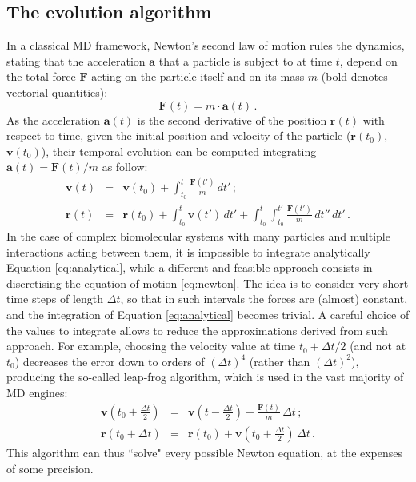 \subsection{The evolution algorithm}
In a classical MD framework, Newton's second law of motion rules the dynamics, stating that the acceleration $\textbf{a}$ that a particle is subject to at time $t$, depend on the total force $\textbf{F}$ acting on the particle itself and on its mass $m$ (bold denotes vectorial quantities):
\begin{equation} \label{eq:newton}
\textbf{F}(t) =  m \cdot \textbf{a}(t) \, .
\end{equation}
As the acceleration $\textbf{a}(t)$ is the second derivative of the position $\textbf{r}(t)$ with respect to time, given the initial position and velocity of the particle ($\textbf{r}(t_0)$, $\textbf{v}(t_0)$), their temporal evolution can be computed integrating $\textbf{a}(t) = \textbf{F}(t)/m$ as follow:
\begin{eqnarray} \label{eq:analytical}
\mathbf{v}(t) &=& \mathbf{v}(t_0) + \int_{t_0}^t \frac{\mathbf{F}(t')}{m} \, dt' \, ; \\
\mathbf{r}(t) &=& \mathbf{r}(t_0) + \int_{t_0}^t \mathbf{v}(t') \, dt' + \int_{t_0}^t \int_{t_0}^{t'} \frac{\mathbf{F}(t')}{m} \, dt'' \, dt'\, .
\end{eqnarray}
In the case of complex biomolecular systems with many particles and multiple interactions acting between them, it is impossible to integrate analytically Equation \ref{eq:analytical}, while a different and feasible approach consists in discretising the equation of motion \ref{eq:newton}.
%
The idea is to consider very short time steps of length $\Delta t$, so that in such intervals the forces are (almost) constant, and the integration of Equation \ref{eq:analytical} becomes trivial.
%
A careful choice of the values to integrate allows to reduce the approximations derived from such approach.
For example, choosing the velocity value at time $t_0 + \Delta t/2$ (and not at $t_0$) decreases the error down to orders of $(\Delta t)^4$ (rather than $(\Delta t)^2$), producing the so-called leap-frog algorithm, which is used in the vast majority of MD engines:
\begin{eqnarray}
\mathbf{v}\left(t_0 + \frac{\Delta t}{2}\right) &=& \mathbf{v}\left(t - \frac{\Delta t}{2}\right) + \frac{\mathbf{F}(t)}{m} \, \Delta t \, ; \\
\mathbf{r}(t_0 + \Delta t) &=& \mathbf{r}(t_0) + \mathbf{v}\left(t_0 + \frac{\Delta t}{2}\right) \, \Delta t \, .
\end{eqnarray}
This algorithm can thus ``solve" every possible Newton equation, at the expenses of some precision.


